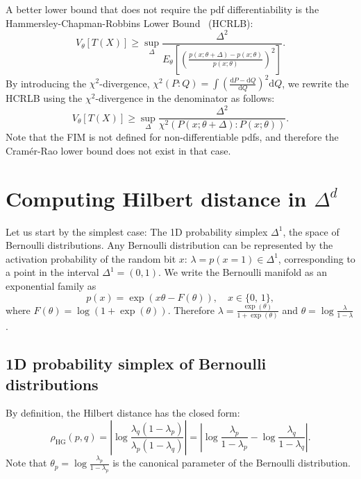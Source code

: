 \documentclass[graybox]{svmult}
\def\dP{{\mathrm{d}P}}
\def\dQ{{\mathrm{d}Q}}
\begin{document}
A better lower bound that does not require the pdf differentiability is the Hammersley-Chapman-Robbins Lower Bound~\cite{Hammersley-1950,ChapmanRobbins-1951} (HCRLB):
\begin{equation}
V_\theta[T(X)]\geq \sup_\Delta \frac{\Delta^2}{E_\theta\left[\left(\frac{p(x;\theta+\Delta)-p(x;\theta)}{p(x;\theta)}\right)^2\right]}.
\end{equation}
By introducing the $\chi^2$-divergence, $\chi^2(P:Q)=\int \left(\frac{\dP-\dQ}{\dQ}\right)^2 \dQ$, we rewrite the HCRLB 
using the  $\chi^2$-divergence in the denominator as follows:
\begin{equation}
V_\theta[T(X)]\geq \sup_\Delta \frac{\Delta^2}{\chi^2(P(x;\theta+\Delta):P(x;\theta))}.
\end{equation}
Note that the FIM is not defined for non-differentiable pdfs, and therefore the Cram\'er-Rao
lower bound does not exist in that case. 

\section{Computing Hilbert distance in $\Delta^d$}\label{sec:dist}

Let us start by the simplest case: The 1D probability simplex $\Delta^1$,
the space of Bernoulli distributions.
Any Bernoulli distribution can be represented by the activation
probability of the random bit $x$: $\lambda=p(x=1)\in\Delta^1$,
corresponding to a point in the interval $\Delta^1=(0,1)$. We
write the Bernoulli manifold as an exponential family as
$$
p(x) = \exp\left(x \theta - F(\theta) \right),\quad{}x\in\{0,\,1\},
$$
where $F(\theta)=\log(1+\exp(\theta))$. Therefore
$\lambda=\frac{\exp(\theta)}{1+\exp(\theta)}$ and $\theta=\log\frac{\lambda}{1-\lambda}$.

\subsection{1D probability simplex of Bernoulli distributions}

By definition, the Hilbert distance has the closed form:
$$
\rho_{\mathrm{HG}}(p,q)
= \left\vert\log\frac{\lambda_q(1-\lambda_p)}{\lambda_p(1-\lambda_q)}\right\vert
= \left\vert\log\frac{\lambda_p}{1-\lambda_p}-\log\frac{\lambda_q}{1-\lambda_q}\right\vert.
$$
Note that $\theta_p=\log\frac{\lambda_p}{1-\lambda_p}$ is the canonical parameter of the Bernoulli distribution.
\end{document}
